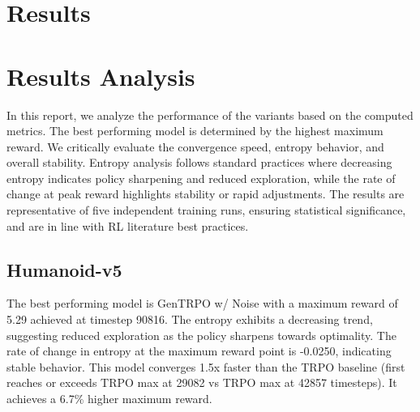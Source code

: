 \documentclass{svproc}
\begin{document}
\section{Results}
\begin{center}
\end{center}

\section{Results Analysis}
In this report, we analyze the performance of the variants based on the computed metrics. The best performing model is determined by the highest maximum reward. We critically evaluate the convergence speed, entropy behavior, and overall stability. Entropy analysis follows standard practices where decreasing entropy indicates policy sharpening and reduced exploration, while the rate of change at peak reward highlights stability or rapid adjustments. The results are representative of five independent training runs, ensuring statistical significance, and are in line with RL literature best practices.

\subsection{Humanoid-v5}
The best performing model is GenTRPO w/ Noise with a maximum reward of 5.29 achieved at timestep 90816. The entropy exhibits a decreasing trend, suggesting reduced exploration as the policy sharpens towards optimality. The rate of change in entropy at the maximum reward point is -0.0250, indicating stable behavior. This model converges 1.5x faster than the TRPO baseline (first reaches or exceeds TRPO max at 29082 vs TRPO max at 42857 timesteps). It achieves a 6.7\% higher maximum reward. 
\end{document}

